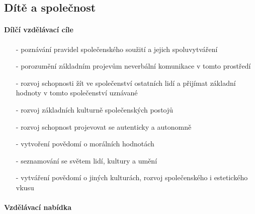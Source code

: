 			\subsection{Dítě a společnost}
				\textit{} \citep[s.~26]{RVP}

					\paragraph{Dílčí vzdělávací cíle}

					\begin{itemize}
					\setlength\itemsep{-2mm}
						\item[-]poznávání pravidel společenského soužití a jejich spoluvytváření
						\item[-]porozumění základním projevům neverbální komunikace v tomto prostředí
						\item[-]rozvoj schopnosti žít ve společenství ostatních lidí a přijímat základní hodnoty v tomto společenství uznávané
						\item[-]rozvoj základních kulturně společenských postojů
						\item[-]rozvoj schopnost projevovat se autenticky a autonomně
						\item[-]vytvoření povědomí o morálních hodnotách
						\item[-]seznamování se světem lidí, kultury a umění
						\item[-]vytváření povědomí o jiných kulturách, rozvoj společenského i estetického vkusu
					\end{itemize}

					\paragraph{Vzdělávací nabídka}

